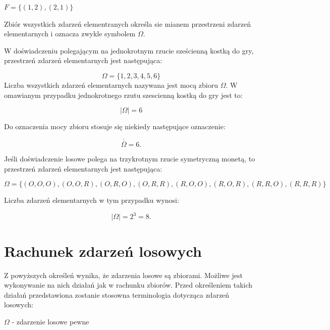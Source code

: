 \documentclass[
  letterpaper,
  DIV=11,
  numbers=noendperiod]{scrreprt}
\begin{document}
\(F = \{{(1,2),(2,1)}\}\)

\begin{tcolorbox}[enhanced jigsaw, toprule=.15mm, title=\textcolor{quarto-callout-note-color}{\faInfo}\hspace{0.5em}{Przestrzeń zdarzeń elementarnych}, breakable, coltitle=black, titlerule=0mm, colbacktitle=quarto-callout-note-color!10!white, opacitybacktitle=0.6, opacityback=0, bottomtitle=1mm, left=2mm, arc=.35mm, leftrule=.75mm, bottomrule=.15mm, rightrule=.15mm, toptitle=1mm, colframe=quarto-callout-note-color-frame, colback=white]

Zbiór wszystkich zdarzeń elementranych określa sie mianem przestrzeni
zdarzeń elementarnych i oznacza zwykle symbolem \(\Omega\).

\end{tcolorbox}

W doświadczeniu polegającym na jednokrotnym rzucie sześcienną kostką do
gry, przestrzeń zdarzeń elementarnych jest następująca:

\[\Omega=\{{1,2,3,4,5,6\}}\] Liczba wszystkich zdarzeń elementarnych
nazywana jest mocą zbioru \(\Omega\). W omawianym przypadku
jednokrotnego rzutu szescienną kostką do gry jest to:

\[ |\Omega| = 6\]

Do oznaczenia mocy zbioru stosuje się niekiedy następujące oznaczenie:

\[ \overline {\overline \Omega} = 6.\]

Jeśli doświadczenie losowe polega na trzykrotnym rzucie symetryczną
monetą, to przestrzeń zdarzeń elementarnych jest następująca:

\[\Omega=\{{ (O,O,O), (O,O,R), (O,R,O), (O,R,R), (R,O,O), (R,O,R), (R,R,O), (R,R,R)    \}}\]

Liczba zdarzeń elementarnych w tym przypadku wynosi:

\[ |\Omega| = 2^3 = 8.\]

\section{Rachunek zdarzeń losowych}\label{rachunek-zdarzeux144-losowych}

Z powyższych określeń wynika, że zdarzenia losowe są zbiorami. Możliwe
jest wykonywanie na nich działań jak w rachunku zbiorów. Przed
określeniem takich działań przedstawiona zostanie stosowna terminologia
dotycząca zdarzeń losowych:

\(\Omega\) - zdarzenie losowe pewne
\end{document}
